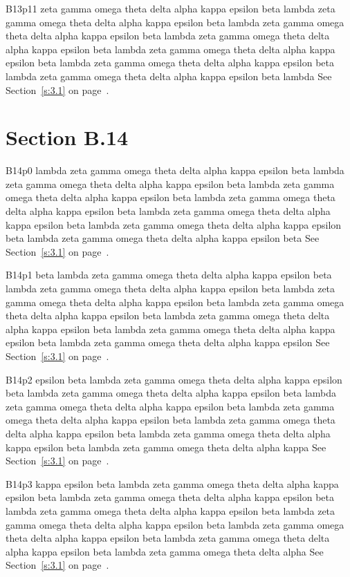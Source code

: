 B13p11 zeta gamma omega theta delta alpha kappa epsilon beta lambda zeta gamma omega theta delta alpha kappa epsilon beta lambda zeta gamma omega theta delta alpha kappa epsilon beta lambda zeta gamma omega theta delta alpha kappa epsilon beta lambda zeta gamma omega theta delta alpha kappa epsilon beta lambda zeta gamma omega theta delta alpha kappa epsilon beta lambda zeta gamma omega theta delta alpha kappa epsilon beta lambda See Section~\ref{s:3.1} on page~\pageref{s:3.1}.

\section{Section B.14}\label{s:B.14}
B14p0 lambda zeta gamma omega theta delta alpha kappa epsilon beta lambda zeta gamma omega theta delta alpha kappa epsilon beta lambda zeta gamma omega theta delta alpha kappa epsilon beta lambda zeta gamma omega theta delta alpha kappa epsilon beta lambda zeta gamma omega theta delta alpha kappa epsilon beta lambda zeta gamma omega theta delta alpha kappa epsilon beta lambda zeta gamma omega theta delta alpha kappa epsilon beta See Section~\ref{s:3.1} on page~\pageref{s:3.1}.

B14p1 beta lambda zeta gamma omega theta delta alpha kappa epsilon beta lambda zeta gamma omega theta delta alpha kappa epsilon beta lambda zeta gamma omega theta delta alpha kappa epsilon beta lambda zeta gamma omega theta delta alpha kappa epsilon beta lambda zeta gamma omega theta delta alpha kappa epsilon beta lambda zeta gamma omega theta delta alpha kappa epsilon beta lambda zeta gamma omega theta delta alpha kappa epsilon See Section~\ref{s:3.1} on page~\pageref{s:3.1}.

B14p2 epsilon beta lambda zeta gamma omega theta delta alpha kappa epsilon beta lambda zeta gamma omega theta delta alpha kappa epsilon beta lambda zeta gamma omega theta delta alpha kappa epsilon beta lambda zeta gamma omega theta delta alpha kappa epsilon beta lambda zeta gamma omega theta delta alpha kappa epsilon beta lambda zeta gamma omega theta delta alpha kappa epsilon beta lambda zeta gamma omega theta delta alpha kappa See Section~\ref{s:3.1} on page~\pageref{s:3.1}.

B14p3 kappa epsilon beta lambda zeta gamma omega theta delta alpha kappa epsilon beta lambda zeta gamma omega theta delta alpha kappa epsilon beta lambda zeta gamma omega theta delta alpha kappa epsilon beta lambda zeta gamma omega theta delta alpha kappa epsilon beta lambda zeta gamma omega theta delta alpha kappa epsilon beta lambda zeta gamma omega theta delta alpha kappa epsilon beta lambda zeta gamma omega theta delta alpha See Section~\ref{s:3.1} on page~\pageref{s:3.1}.

